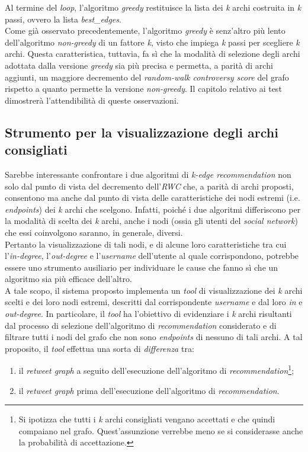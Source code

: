 Al termine del \textit{loop}, l'algoritmo \textit{greedy} restituisce la lista dei \textit{k} archi costruita in \textit{k} passi, ovvero la lista \textit{best\_edges}.
\\Come già osservato precedentemente, l'algoritmo \textit{greedy} è senz'altro più lento dell'algoritmo \textit{non-greedy} di un fattore \textit{k}, visto che impiega \textit{k} passi per scegliere \textit{k} archi. Questa caratteristica, tuttavia, fa sì che la modalità di selezione degli archi adottata dalla versione \textit{greedy} sia più precisa e permetta, a parità di archi aggiunti, un maggiore decremento del \textit{random-walk controversy score} del grafo rispetto a quanto permette la versione \textit{non-greedy}. Il capitolo relativo ai test dimostrerà l'attendibilità di queste osservazioni.

\subsection{Strumento per la visualizzazione degli archi consigliati}
Sarebbe interessante confrontare i due algoritmi di \textit{k-edge recommendation} non solo dal punto di vista del decremento dell'\textit{RWC} che, a parità di archi proposti, consentono ma anche dal punto di vista delle caratteristiche dei nodi estremi (i.e. \textit{endpoints}) dei \textit{k} archi che scelgono. Infatti, poiché i due algoritmi differiscono per la modalità di scelta dei \textit{k} archi, anche i nodi (ossia gli utenti del \textit{social network}) che essi coinvolgono saranno, in generale, diversi. 
\\Pertanto la visualizzazione di tali nodi, e di alcune loro caratteristiche tra cui l'\textit{in-degree}, l'\textit{out-degree} e l'\textit{username} dell'utente al quale corrispondono, potrebbe essere uno strumento ausiliario per individuare le cause che fanno sì che un algoritmo sia più efficace dell'altro.
\\A tale scopo, il sistema proposto implementa un \textit{tool} di visualizzazione dei \textit{k} archi scelti e dei loro nodi estremi, descritti dal corrispondente \textit{username} e dal loro \textit{in} e \textit{out-degree}. In particolare, il \textit{tool} ha l'obiettivo di evidenziare i \textit{k} archi risultanti dal processo di selezione dell'algoritmo di \textit{recommendation} considerato e di filtrare tutti i nodi del grafo che non sono \textit{endpoints} di nessuno di tali archi. A tal proposito, il \textit{tool} effettua una sorta di \textit{differenza} tra:
\begin{enumerate}
\item il \textit{retweet graph} a seguito dell'esecuzione dell'algoritmo di \textit{recommendation}\footnote{Si ipotizza che tutti i \textit{k} archi consigliati vengano accettati e che quindi compaiano nel grafo. Quest'assunzione verrebbe meno se si considerasse anche la probabilità di accettazione.}; 
\item il \textit{retweet graph} prima dell'esecuzione dell'algoritmo di \textit{recommendation}. 
\end{enumerate}
